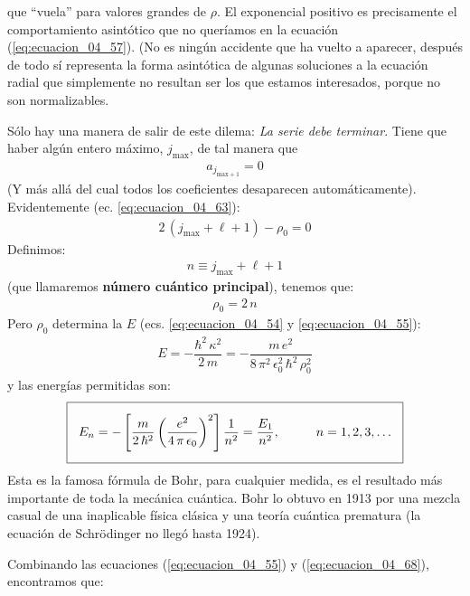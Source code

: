 que \enquote{vuela} para valores grandes de $\rho$. El exponencial positivo es precisamente el comportamiento asintótico que no queríamos en la ecuación (\ref{eq:ecuacion_04_57}). (No es ningún accidente que ha vuelto a aparecer, después de todo sí representa la forma asintótica de algunas soluciones a la ecuación radial que simplemente no resultan ser los que estamos interesados, porque no son normalizables.
\par
Sólo hay una manera de salir de este dilema: \emph{La serie debe terminar}. Tiene que haber algún entero máximo, $j_{\text{max}}$, de tal manera que
\begin{align}
a_{j_{\text{max} + 1}} = 0
\label{eq:ecuacion_04_66}
\end{align}
(Y más allá del cual todos los coeficientes desaparecen automáticamente). Evidentemente (ec. \ref{eq:ecuacion_04_63}):
\begin{align*}
2 \, (j_{\text{max}} + \ell + 1) - \rho_{0} = 0
\end{align*}
Definimos:
\begin{align}
n \equiv j_{\text{max}} + \ell + 1
\label{eq:ecuacion_04_67}
\end{align}
(que llamaremos \textbf{número cuántico principal}), tenemos que:
\begin{align}
\rho_{0} = 2 \, n
\label{eq:ecuacion_04_68}
\end{align}
Pero $\rho_{0}$ determina la $E$ (ecs. \ref{eq:ecuacion_04_54} y \ref{eq:ecuacion_04_55}):
\begin{align}
E = - \dfrac{\hbar^{2} \, \kappa^{2}}{2 \, m} = - \dfrac{m \, e^{2}}{8 \, \pi^{2} \, \epsilon_{0}^{2} \, \hbar^{2} \, \rho_{0}^{2}}
\label{eq:ecuacion_04_69}
\end{align}
y las energías permitidas son:
\begin{align}
\setlength{\fboxsep}{3\fboxsep}\boxed{
E_{n} = - \left[ \dfrac{m}{2 \, \hbar^{2}} \left( \dfrac{e^{2}}{4 \, \pi \, \epsilon_{0}} \right)^{2} \right] \dfrac{1}{n^{2}} = \dfrac{E_{1}}{n^{2}}, \hspace{1cm} n = 1, 2, 3, \ldots}
\label{eq:ecuacion_04_70}
\end{align}
Esta es la famosa fórmula de Bohr, para cualquier medida, es el resultado más importante de toda la mecánica cuántica. Bohr lo obtuvo en 1913 por una mezcla casual de una inaplicable física clásica y una teoría cuántica prematura (la ecuación de Schrödinger no llegó hasta 1924).
\par
Combinando las ecuaciones (\ref{eq:ecuacion_04_55}) y (\ref{eq:ecuacion_04_68}), encontramos que:
